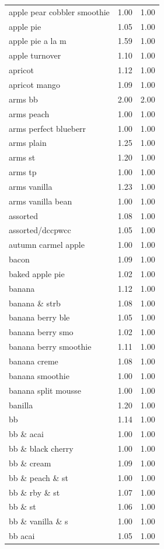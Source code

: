 \begin{table}
\begin{tabular}{lrr}
apple pear cobbler smoothie & 1.00 & 1.00 \\
apple pie & 1.05 & 1.00 \\
apple pie a la m & 1.59 & 1.00 \\
apple turnover & 1.10 & 1.00 \\
apricot & 1.12 & 1.00 \\
apricot mango & 1.09 & 1.00 \\
arms bb & 2.00 & 2.00 \\
arms peach & 1.00 & 1.00 \\
arms perfect blueberr & 1.00 & 1.00 \\
arms plain & 1.25 & 1.00 \\
arms st & 1.20 & 1.00 \\
arms tp & 1.00 & 1.00 \\
arms vanilla & 1.23 & 1.00 \\
arms vanilla bean & 1.00 & 1.00 \\
assorted & 1.08 & 1.00 \\
assorted/dccpwcc & 1.05 & 1.00 \\
autumn carmel apple & 1.00 & 1.00 \\
bacon & 1.09 & 1.00 \\
baked apple pie & 1.02 & 1.00 \\
banana & 1.12 & 1.00 \\
banana \& strb & 1.08 & 1.00 \\
banana berry ble & 1.05 & 1.00 \\
banana berry smo & 1.02 & 1.00 \\
banana berry smoothie & 1.11 & 1.00 \\
banana creme & 1.08 & 1.00 \\
banana smoothie & 1.00 & 1.00 \\
banana split mousse & 1.00 & 1.00 \\
banilla & 1.20 & 1.00 \\
bb & 1.14 & 1.00 \\
bb \& acai & 1.00 & 1.00 \\
bb \& black cherry & 1.00 & 1.00 \\
bb \& cream & 1.09 & 1.00 \\
bb \& peach \& st & 1.00 & 1.00 \\
bb \& rby \& st & 1.07 & 1.00 \\
bb \& st & 1.06 & 1.00 \\
bb \& vanilla \& s & 1.00 & 1.00 \\
bb acai & 1.05 & 1.00 \\

\end{tabular}
\end{table}
